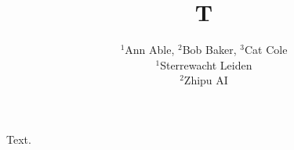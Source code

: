 \documentclass{article}
\begin{document}
\title{T}
\author{$^1$Ann Able, $^2$Bob Baker, $^3$Cat Cole\\ $^1$Sterrewacht Leiden\\ $^2$Zhipu AI}
\maketitle
Text.
\end{document}

